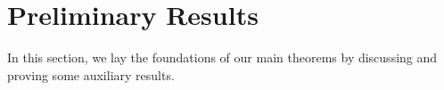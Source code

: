\documentclass[reqno, a4paper]{amsart}
\newcommand{\lc}{\preceq_{\textnormal{c}}}
\newcommand{\ld}{\preceq_{E}}
\newcommand{\PP}{\mathcal{P}}
\newcommand{\R}{\mathbb R}
\theoremstyle{definition}
\theoremstyle{definition}
\theoremstyle{definition}
\begin{document}



\section{Preliminary Results}
\label{PR}
In this section, we lay the foundations of our main theorems by discussing and proving some auxiliary results. 
\end{document}
